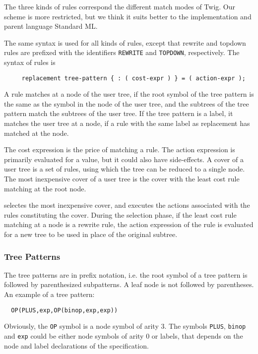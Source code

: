 The three kinds of rules correspond the different match modes of Twig.
Our scheme is more restricted, but we think it suits better
to the implementation and parent language Standard ML.

The same syntax is used for all kinds of rules, except that rewrite and
topdown rules are prefixed with the identifiers {\tt REWRITE} and {\tt TOPDOWN},
respectively. The syntax of rules is
\begin{verbatim}
     replacement tree-pattern { : ( cost-expr ) } = ( action-expr );
\end{verbatim}

A rule matches at a node of the user tree, if the root symbol of the
tree pattern is the same as the symbol in the node of the user tree,
and the subtrees of the tree pattern match the subtrees of the user tree.
If the tree pattern is a label, it matches the user tree at a node,
if a rule with the same label as replacement has matched at the node.

The cost expression is the price of matching a rule. The action expression
is primarily evaluated for a value, but it could also have side-effects.
A cover of a user tree is a set of rules, using which the tree can be
reduced to a single node.
The most inexpensive cover of a user tree is the cover with the least
cost rule matching at the root node.

\mltwig selectes the most inexpensive cover, and executes the
actions associated with the rules constituting the cover. During
the selection phase, if the least cost rule matching at a node is
a rewrite rule, the action expression of the rule is evaluated for a new
tree to be used in place of the original subtree.

\subsubsection{Tree Patterns}

The tree patterns are in prefix notation, i.e. the root symbol
of a tree pattern is followed by parenthesized subpatterns.
A leaf node is not followed by parentheses.
An example of a tree pattern:
\begin{verbatim}
  OP(PLUS,exp,OP(binop,exp,exp))
\end{verbatim}
Obviously, the {\tt OP} symbol is a node symbol of arity 3.
The symbols {\tt PLUS}, {\tt binop} and {\tt exp} could be either
node symbols of arity 0 or labels, that depends on the node and
label declarations of the specification.

